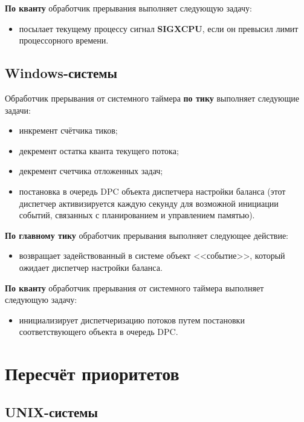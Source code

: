 \textbf{По кванту} обработчик прерывания выполняет следующую задачу:

\begin{itemize}
	\item посылает текущему процессу сигнал \textbf{SIGXCPU}, если он превысил лимит процессорного времени.
\end{itemize}

\section{Windows-системы}

Обработчик прерывания от системного таймера \textbf{по тику} выполняет следующие задачи:

\begin{itemize}
	\item инкремент счётчика тиков;
	\item декремент остатка кванта текущего потока;
	\item декремент счетчика отложенных задач;
	\item постановка в очередь DPC объекта диспетчера настройки баланса (этот диспетчер активизируется каждую секунду для возможной инициации событий, связанных с планированием и управлением памятью).
\end{itemize}

\textbf{По главному тику} обработчик прерывания выполняет следующее действие:

\begin{itemize}
	\item возвращает задействованный в системе объект <<событие>>, который ожидает диспетчер настройки баланса.
\end{itemize}

\textbf{По кванту} обработчик прерывания от системного таймера выполняет следующую задачу:

\begin{itemize}
	\item инициализирует диспетчеризацию потоков путем постановки соответствующего объекта в очередь DPC.
\end{itemize}

\chapter{Пересчёт приоритетов}

\section{UNIX-системы}

